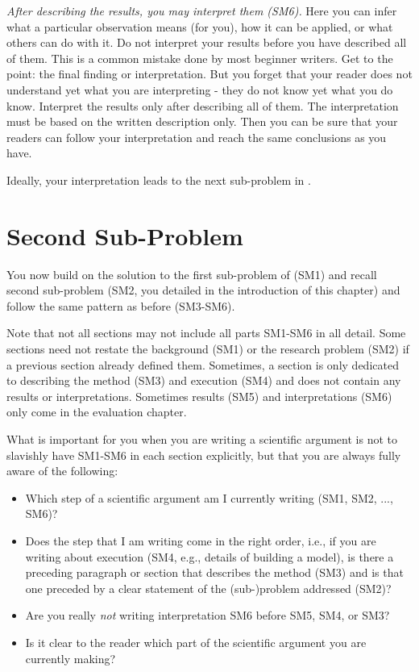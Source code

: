 \emph{After describing the results, you may interpret them (SM6).}
Here you can infer what a particular observation means (for you), how it can be applied, or what others can do with it.
Do not interpret your results before you have described all of them.
This is a common mistake done by most beginner writers.
Get to the point: the final finding or interpretation.
But you forget that your reader does not understand yet what you are interpreting - they do not know yet what you do know.
Interpret the results only after describing all of them.
The interpretation must be based on the written description only.
Then you can be sure that your readers can follow your interpretation and reach the same conclusions as you have.

Ideally, your interpretation leads to the next sub-problem in .

\section{Second Sub-Problem}\label{sec:problem1:subproblem2}

You now build on the solution to the first sub-problem of  (SM1) and recall second sub-problem (SM2, you detailed in the introduction of this chapter) and follow the same pattern as before (SM3-SM6).

Note that not all sections may not include all parts SM1-SM6 in all detail.
Some sections need not restate the background (SM1) or the research problem (SM2) if a previous section already defined them.
Sometimes, a section is only dedicated to describing the method (SM3) and execution (SM4) and does not contain any results or interpretations.
Sometimes results (SM5) and interpretations (SM6) only come in the evaluation chapter.

What is important for you when you are writing a scientific argument is not to slavishly have SM1-SM6 in each section explicitly, but that you are always fully aware of the following:
%
\begin{itemize}
  \item Which step of a scientific argument am I currently writing (SM1, SM2, ..., SM6)?
  \item Does the step that I am writing come in the right order, i.e., if you are writing about execution (SM4, e.g., details of building a model), is there a preceding paragraph or section that describes the method (SM3) and is that one preceded by a clear statement of the (sub-)problem addressed (SM2)?
  \item Are you really \emph{not} writing interpretation SM6 before SM5, SM4, or SM3?
  \item Is it clear to the reader which part of the scientific argument you are currently making?
\end{itemize}

